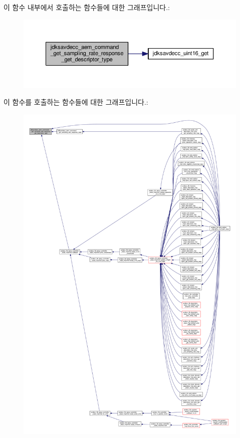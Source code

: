 이 함수 내부에서 호출하는 함수들에 대한 그래프입니다.\+:
\nopagebreak
\begin{figure}[H]
\begin{center}
\leavevmode
\includegraphics[width=350pt]{group__command__get__sampling__rate__response_gafca42dc2dbc04f4fa5a67d0a77c8c659_cgraph}
\end{center}
\end{figure}




이 함수를 호출하는 함수들에 대한 그래프입니다.\+:
\nopagebreak
\begin{figure}[H]
\begin{center}
\leavevmode
\includegraphics[width=350pt]{group__command__get__sampling__rate__response_gafca42dc2dbc04f4fa5a67d0a77c8c659_icgraph}
\end{center}
\end{figure}



